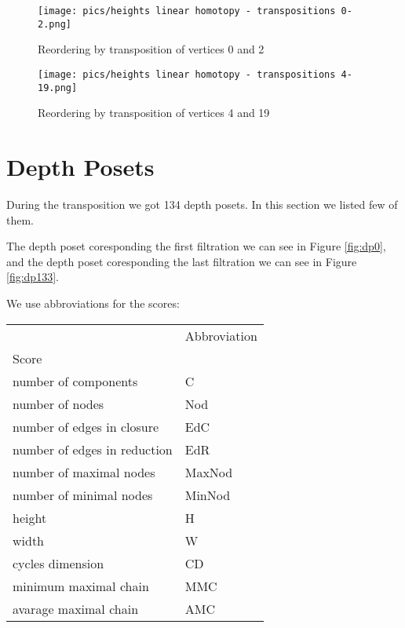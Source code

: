 \documentclass{article}
\begin{document}
\begin{figure}[htbp]
    \centering
    \texttt{[image: pics/heights linear homotopy - transpositions 0-2.png]}
    \caption{Reordering by transposition of vertices 0 and 2}
    \label{fig:transposition0and2}
\end{figure}
\begin{figure}[htbp]
    \centering
    \texttt{[image: pics/heights linear homotopy - transpositions 4-19.png]}
    \caption{Reordering by transposition of vertices 4 and 19}
    \label{fig:transposition4and19}
\end{figure}

\newpage


\section{Depth Posets}
\par During the transposition we got 134 depth posets. In this section we listed few of them. 
\par The depth poset coresponding the first filtration we can see in Figure \ref{fig:dp0}, 
and the depth poset coresponding the last filtration we can see in Figure \ref{fig:dp133}.

\par We use abbroviations for the scores:
\begin{center}
\begin{tabular}{ll}
\toprule
 & Abbroviation \\
Score &  \\
\midrule
number of components & C \\
number of nodes & Nod \\
number of edges in closure & EdC \\
number of edges in reduction & EdR \\
number of maximal nodes & MaxNod \\
number of minimal nodes & MinNod \\
height & H \\
width & W \\
cycles dimension & CD \\
minimum maximal chain & MMC \\
avarage maximal chain & AMC \\
\bottomrule
\end{tabular}

\end{center}
\end{document}
